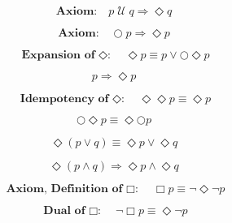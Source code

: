 \documentclass[fleqn, leqno]{article}
\newcommand{\until}{\;\mathcal{U}\;}
\newcommand{\spacer}{\vspace{-30pt}}
\begin{document}
\spacer

\begin{equation}\label{E:untilImpEvent}
\textbf{Axiom:}\quad p \until q \Rightarrow \Diamond q
\end{equation}

\spacer

\begin{equation}\label{E:nextEvent}
\textbf{Axiom:}\quad \bigcirc p \Rightarrow \Diamond p
\end{equation}

\spacer

\begin{equation}\label{E:expansionEvent}
\textbf{Expansion of $\Diamond$:}\quad \Diamond p \equiv p \lor \bigcirc\Diamond p
\end{equation}

\spacer

\begin{equation}\label{E:impEvent}
p \Rightarrow \Diamond p
\end{equation}

\spacer

\begin{equation}\label{E:IdemEvent}
\textbf{Idempotency of $\Diamond$:}\quad \Diamond\Diamond p \equiv \Diamond p
\end{equation}

\spacer

\begin{equation}\label{E:dNextEvent}
\bigcirc\Diamond p \equiv \Diamond\bigcirc p
\end{equation}

\spacer

\begin{equation}\label{E:distEventOr}
\Diamond(p \lor q) \equiv \Diamond p \lor \Diamond q
\end{equation}

\spacer

\begin{equation}\label{E:distEventAnd}
\Diamond(p \land q) \Rightarrow \Diamond p \land \Diamond q
\end{equation}

\spacer

\begin{equation}\label{E:defAlways}
\textbf{Axiom, Definition of $\Box$:}\quad \Box p \equiv \lnot\Diamond\lnot p
\end{equation}

\spacer

\begin{equation}\label{E:dualAlways}
\textbf{Dual of $\Box$:}\quad \lnot\Box p \equiv \Diamond\lnot p
\end{equation}
\end{document}
